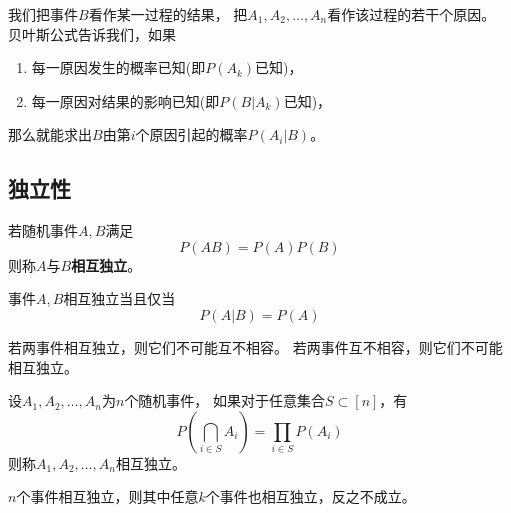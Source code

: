 \begin{remark}
  我们把事件$B$看作某一过程的结果，
  把$A_1,A_2,\dots,A_n$看作该过程的若干个原因。
  贝叶斯公式告诉我们，如果
  \begin{enumerate}
    \item 
    每一原因发生的概率已知(即$P(A_k)$已知)，
    \item 
    每一原因对结果的影响已知(即$P(B|A_k)$已知)，
  \end{enumerate}
  那么就能求出$B$由第$i$个原因引起的概率$P(A_i|B)$。
\end{remark}

\subsection{独立性}
\begin{definition}[两个随机事件的相互独立性]
  若随机事件$A,B$满足
  \begin{displaymath}
    P(AB)=P(A)P(B)
  \end{displaymath}
  则称$A$与$B$\textbf{相互独立}。
\end{definition}

\begin{theorem}[两个随机事件相互独立的充要条件]
  事件$A,B$相互独立当且仅当
  \begin{displaymath}
    P(A|B) = P(A)
  \end{displaymath}
\end{theorem}

\begin{theorem}[相互独立与互不相容的关系]
  若两事件相互独立，则它们不可能互不相容。
  若两事件互不相容，则它们不可能相互独立。
\end{theorem}

\begin{definition}[$n$个事件的相互独立性]
  设$A_1,A_2,\dots,A_n$为$n$个随机事件，
  如果对于任意集合$S \subset[n]$，有
  \begin{displaymath}
    P\left(\bigcap_{i\in S} A_i\right) = \prod_{i\in S}P(A_i)
  \end{displaymath}
  则称$A_1,A_2,\dots,A_n$相互独立。
\end{definition}

\begin{remark}
  $n$个事件相互独立，则其中任意$k$个事件也相互独立，反之不成立。
\end{remark}
